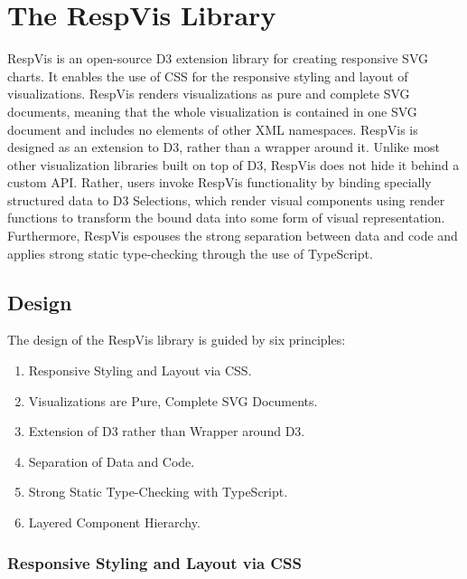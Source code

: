 
\chapter{The RespVis Library}
\label{chap:RespVis}

RespVis is an open-source D3 extension library for creating responsive
SVG charts. It enables the use of CSS for the responsive styling and
layout of visualizations. RespVis renders visualizations as pure and
complete SVG documents, meaning that the whole visualization is
contained in one SVG document and includes no elements of other XML
namespaces. RespVis is designed as an extension to D3, rather than a
wrapper around it. Unlike most other visualization libraries built on
top of D3, RespVis does not hide it behind a custom API. Rather, users
invoke RespVis functionality by binding specially structured data to
D3 Selections, which render visual components using render functions
to transform the bound data into some form of visual
representation. Furthermore, RespVis espouses the strong separation
between data and code and applies strong static type-checking through
the use of TypeScript.



\section{Design}
\label{sec:Design}

The design of the RespVis library is guided by six principles:
\begin{enumerate}
\item Responsive Styling and Layout via CSS.
\item Visualizations are Pure, Complete SVG Documents.
\item Extension of D3 rather than Wrapper around D3.
\item Separation of Data and Code.
\item Strong Static Type-Checking with TypeScript.
\item Layered Component Hierarchy.
\end{enumerate}



\subsection{Responsive Styling and Layout via CSS}


